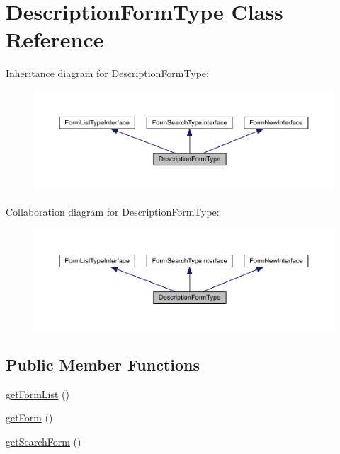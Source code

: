 \hypertarget{class_entity_1_1_description_form_type}{\section{Description\-Form\-Type Class Reference}
\label{class_entity_1_1_description_form_type}
}


Inheritance diagram for Description\-Form\-Type\-:
\nopagebreak
\begin{figure}[H]
\begin{center}
\leavevmode
\includegraphics[width=350pt]{class_entity_1_1_description_form_type__inherit__graph}
\end{center}
\end{figure}


Collaboration diagram for Description\-Form\-Type\-:
\nopagebreak
\begin{figure}[H]
\begin{center}
\leavevmode
\includegraphics[width=350pt]{class_entity_1_1_description_form_type__coll__graph}
\end{center}
\end{figure}
\subsection*{Public Member Functions}
\begin{DoxyCompactItemize}
\item 
\hyperlink{class_entity_1_1_description_form_type_ac43eaa53ae74ecad8ffee5da84508eed}{get\-Form\-List} ()
\item 
\hyperlink{class_entity_1_1_description_form_type_a6aed11d79758a2d06062c8cd94bab221}{get\-Form} ()
\item 
\hyperlink{class_entity_1_1_description_form_type_ab6cde0cbc465c2eaf21142956e5ca8d8}{get\-Search\-Form} ()
\end{DoxyCompactItemize}
